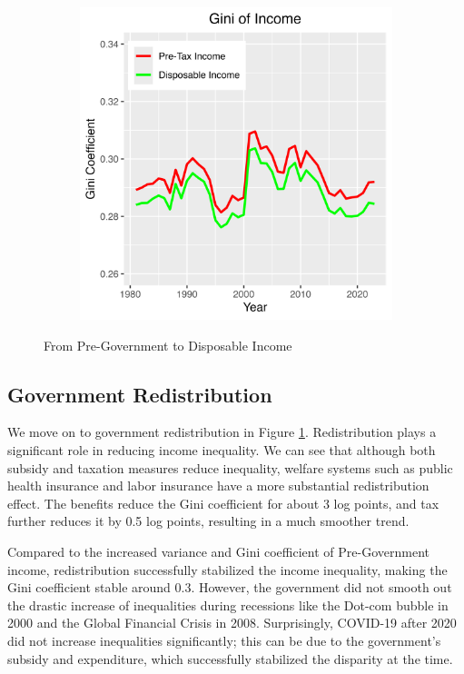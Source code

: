 \documentclass{article}
\begin{document}
\begin{figure}[t]
\begin{subfigure}[t]{0.475\textwidth}
    \end{subfigure}
    \begin{subfigure}[t]{0.475\textwidth}
        \centering
        \includegraphics[width=\textwidth]{figures/Fig_5/Fig_5d_Gini_inc.png}
    \end{subfigure}
    \caption{From Pre-Government to Disposable Income}
    \label{fig:Gov}
\end{figure}

\subsection{Government Redistribution}

We move on to government redistribution in Figure \ref{fig:Gov}. Redistribution plays a significant role in reducing income inequality. We can see that although both subsidy and taxation measures reduce inequality, welfare systems such as public health insurance and labor insurance have a more substantial redistribution effect. The benefits reduce the Gini coefficient for about 3 log points, and tax further reduces it by 0.5 log points, resulting in a much smoother trend.

Compared to the increased variance and Gini coefficient of Pre-Government income, redistribution successfully stabilized the income inequality, making the Gini coefficient stable around 0.3. However, the government did not smooth out the drastic increase of inequalities during recessions like the Dot-com bubble in 2000 and the Global Financial Crisis in 2008. Surprisingly, COVID-19 after 2020 did not increase inequalities significantly; this can be due to the government's subsidy and expenditure, which successfully stabilized the disparity at the time.
\end{document}
